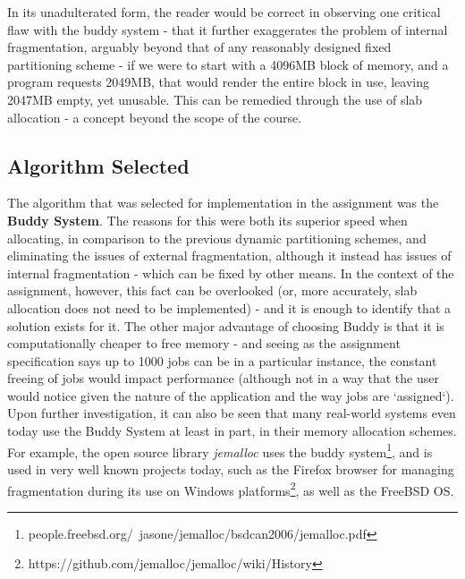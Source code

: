 \documentclass[11pt]{article}
\begin{document}
In its unadulterated form, the reader would be correct in observing one critical flaw with the buddy system - that it further exaggerates the problem of internal fragmentation, arguably beyond that of any reasonably designed fixed partitioning scheme - if we were to start with a 4096MB block of memory, and a program requests 2049MB, that would render the entire block in use, leaving 2047MB empty, yet unusable. This can be remedied through the use of slab allocation - a concept beyond the scope of the course.\\

\subsection{Algorithm Selected}
The algorithm that was selected for implementation in the assignment was the \textbf{Buddy System}. The reasons for this were both its superior speed when allocating, in comparison to the previous dynamic partitioning schemes, and eliminating the issues of external fragmentation, although it instead has issues of internal fragmentation - which can be fixed by other means. In the context of the assignment, however, this fact can be overlooked (or, more accurately, slab allocation does not need to be implemented) - and it is enough to identify that a solution exists for it. The other major advantage of choosing Buddy is that it is computationally cheaper to free memory - and seeing as the assignment specification says up to 1000 jobs can be in a particular instance, the constant freeing of jobs would impact performance (although not in a way that the user would notice given the nature of the application and the way jobs are `assigned`).\\

Upon further investigation, it can also be seen that many real-world systems even today use the Buddy System at least in part, in their memory allocation schemes. For example, the open source library \textit{jemalloc} uses the buddy system\footnote{people.freebsd.org/~jasone/jemalloc/bsdcan2006/jemalloc.pdf}, and is used in very well known projects today, such as the Firefox browser for managing fragmentation during its use on Windows platforms\footnote{https://github.com/jemalloc/jemalloc/wiki/History}, as well as the FreeBSD OS.

\iffalse (Justification of choice - identifies memory allocation algorithm used in code and clearly justifies choice in context of assignment - 2 marks) \fi

\pagebreak
\end{document}
